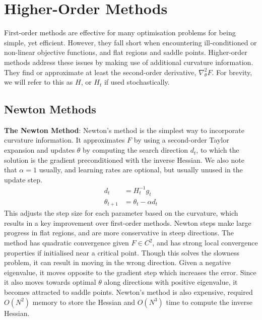\section{Higher-Order Methods}
First-order methods are effective for many optimisation problems for being simple, yet efficient. However, they fall short when encountering ill-conditioned or non-linear objective functions, and flat regions and saddle points. Higher-order methods address these issues by making use of additional curvature information. They find or approximate at least the second-order derivative, $\nabla_{\theta}^{2}F$. For brevity, we will refer to this as $H$, or $H_t$ if used stochastically. 

\subsection{Newton Methods} \label{sec:newton_methods}
\textbf{The Newton Method}: Newton's method is the simplest way to incorporate curvature information. It approximates $F$ by using a second-order Taylor expansion and updates $\theta$ by computing the search direction $d_t$, to which the solution is the gradient preconditioned with the inverse Hessian. We also note that $\alpha = 1$ usually, and learning rates are optional, but usually unused in the update step.
\begin{align}
    d_t &= H_t^{-1} g_t \\
    \theta_{t+1} &= \theta_t - \alpha d_t
\end{align}
This adjusts the step size for each parameter based on the curvature, which results in a key improvement over first-order methods. Newton steps make large progress in flat regions, and are more conservative in steep directions. The method has quadratic convergence given $F \in C^{2}$, and has strong local convergence properties if initialised near a critical point. Though this solves the slowness problem, it can result in moving in the wrong direction. Given a negative eigenvalue, it moves opposite to the gradient step which increases the error. Since it also moves towards optimal $\theta$ along directions with positive eigenvalue, it becomes attracted to saddle points.
Newton's method is also expensive, required $O(N^2)$ memory to store the Hessian and $O(N^3)$ time to compute the inverse Hessian.

